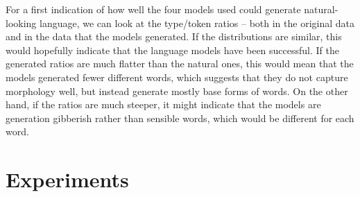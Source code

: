 \documentclass[11pt,a4paper,twoside,openright]{scrbook}
\begin{document}
For a first indication of how well the four models used could generate natural-looking language, we can look at the type/token ratios – both in the original data and in the data that the models generated. If the distributions are similar, this would hopefully indicate that the language models have been successful. If the generated ratios are much flatter than the natural ones, this would mean that the models generated fewer different words, which suggests that they do not capture morphology well, but instead generate mostly base forms of words. On the other hand, if the ratios are much steeper, it might indicate that the models are generation gibberish rather than sensible words, which would be different for each word. 




\chapter{Experiments}
\end{document}
